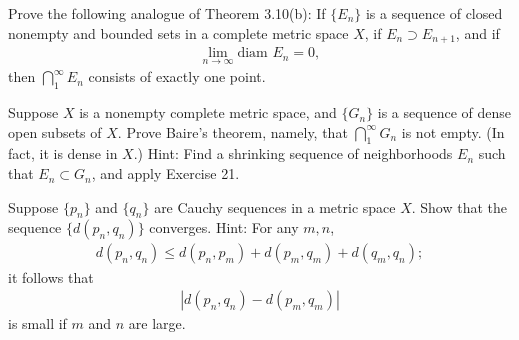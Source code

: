   \begin{exercise}[Rudin 3.21]
    Prove the following analogue of Theorem 3.10(b): If $\{E_n\}$ is a sequence of closed nonempty and bounded sets in a complete metric space $X$, if $E_n \supset E_{n+1}$, and if
    \begin{align*}
      \lim_{n \to \infty} \text{diam } E_n = 0,
    \end{align*}
    then $\bigcap_{1}^{\infty} E_n$ consists of exactly one point.
  \end{exercise}
  \begin{solution}
    
  \end{solution}

  \begin{exercise}[Rudin 3.22]
    Suppose $X$ is a nonempty complete metric space, and $\{G_n\}$ is a sequence of dense open subsets of $X$. Prove Baire's theorem, namely, that $\bigcap_{1}^{\infty}G_n$ is not empty. (In fact, it is dense in $X$.) Hint: Find a shrinking sequence of neighborhoods $E_n$ such that $E_n \subset G_n$, and apply Exercise 21.
  \end{exercise}
  \begin{solution}
    
  \end{solution}

  \begin{exercise}[Rudin 3.23]
    Suppose $\{p_n\}$ and $\{q_n\}$ are Cauchy sequences in a metric space $X$. Show that the sequence $\{d(p_n, q_n)\}$ converges. Hint: For any $m, n$,
    \begin{align*}
      d(p_n, q_n) \leq d(p_n, p_m) + d(p_m, q_m) + d(q_m, q_n);
    \end{align*}
    it follows that
    \begin{align*}
      |d(p_n, q_n) - d(p_m, q_m)|
    \end{align*}
    is small if $m$ and $n$ are large.
  \end{exercise}
  \begin{solution}
    
  \end{solution}

